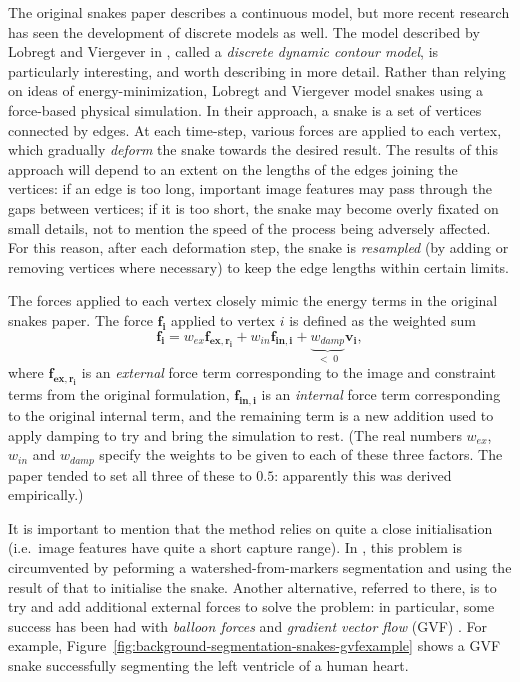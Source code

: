 The original snakes paper describes a continuous model, but more recent research \cite{lobregt95,miller90b,miller90a} has seen the development of discrete models as well. The model described by Lobregt and Viergever in \cite{lobregt95}, called a \emph{discrete dynamic contour model}, is particularly interesting, and worth describing in more detail. Rather than relying on ideas of energy-minimization, Lobregt and Viergever model snakes using a force-based physical simulation. In their approach, a snake is a set of vertices connected by edges. At each time-step, various forces are applied to each vertex, which gradually \emph{deform} the snake towards the desired result. The results of this approach will depend to an extent on the lengths of the edges joining the vertices: if an edge is too long, important image features may pass through the gaps between vertices; if it is too short, the snake may become overly fixated on small details, not to mention the speed of the process being adversely affected. For this reason, after each deformation step, the snake is \emph{resampled} (by adding or removing vertices where necessary) to keep the edge lengths within certain limits.

The forces applied to each vertex closely mimic the energy terms in the original snakes paper. The force $\mathbf{f_i}$ applied to vertex $i$ is defined as the weighted sum
%
\[
\mathbf{f_i} = w_{ex}\mathbf{f_{ex,r_i}} + w_{in}\mathbf{f_{in,i}} + \underbrace{w_{damp}}_{< \; 0}\mathbf{v_i},
\]
%
where $\mathbf{f_{ex,r_i}}$ is an \emph{external} force term corresponding to the image and constraint terms from the original formulation, $\mathbf{f_{in,i}}$ is an \emph{internal} force term corresponding to the original internal term, and the remaining term is a new addition used to apply damping to try and bring the simulation to rest. (The real numbers $w_{ex}$, $w_{in}$ and $w_{damp}$ specify the weights to be given to each of these three factors. The paper tended to set all three of these to $0.5$: apparently this was derived empirically.)

It is important to mention that the method relies on quite a close initialisation (i.e.~image features have quite a short capture range). In \cite{ree05}, this problem is circumvented by peforming a watershed-from-markers segmentation and using the result of that to initialise the snake. Another alternative, referred to there, is to try and add additional external forces to solve the problem: in particular, some success has been had with \emph{balloon forces} \cite{cohen91} and \emph{gradient vector flow} (GVF) \cite{xu98}. For example, Figure~\ref{fig:background-segmentation-snakes-gvfexample} shows a GVF snake successfully segmenting the left ventricle of a human heart.

